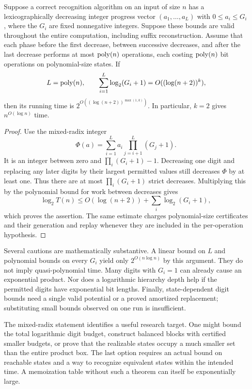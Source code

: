 \begin{proposition}
\label{prop:qp-budget}
Suppose a correct recognition algorithm on an input of size $n$ has a
lexicographically decreasing integer progress vector
$(a_1,\ldots,a_L)$ with $0\le a_i\le G_i$, where the $G_i$ are fixed
nonnegative integers. Suppose these bounds are valid
throughout the entire computation, including suffix reconstruction. Assume
that each phase before the first decrease, between successive decreases,
and after the last decrease performs at most $\operatorname{poly}(n)$ operations,
each costing $\operatorname{poly}(n)$ bit operations on polynomial-size states. If
\[
 L=\operatorname{poly}(n),\qquad
 \sum_{i=1}^{L}\log_2(G_i+1)=O((\log(n+2))^k),
\]
then its running time is
$2^{O((\log(n+2))^{\max(1,k)})}$. In particular, $k=2$ gives
$n^{O(\log n)}$ time.
\end{proposition}
\begin{proof}
Use the mixed-radix integer
\[
 \Phi(a)=\sum_{i=1}^{L}a_i\prod_{j=i+1}^{L}(G_j+1).
\]
It is an integer between zero and $\prod_i(G_i+1)-1$. Decreasing one digit
and replacing any later digits by their largest permitted values still
decreases $\Phi$ by at least one. Thus there are at most
$\prod_i(G_i+1)$ strict decreases. Multiplying this by the polynomial bound
for work between decreases gives
\[
 \log_2 T(n)\le O(\log(n+2))+
                    \sum_i\log_2(G_i+1),
\]
which proves the assertion. The same estimate charges polynomial-size
certificates and their generation and replay whenever they are included in
the per-operation hypothesis.
\end{proof}

Several cautions are mathematically substantive. A linear bound on $L$ and
polynomial bounds on every $G_i$ yield only $2^{O(n\log n)}$ by this argument.
They do not imply quasi-polynomial time. Many digits with $G_i=1$ can already
cause an exponential product. Nor does a logarithmic hierarchy depth help if
the permitted digits have exponential bit lengths. Finally, state-dependent
digit bounds need a single valid potential or a proved amortized replacement;
substituting small bounds observed on one run is insufficient.

The mixed-radix statement identifies a useful research target. One might
bound the total logarithmic digit budget, construct balanced blocks with
certified smaller budgets, or prove that the realizable states occupy a much
smaller set than the entire product box. The last option requires an actual
bound on reachable states and a way to recognize equivalent states within
the intended time. A memoization table without such a theorem can itself
be exponentially large.

